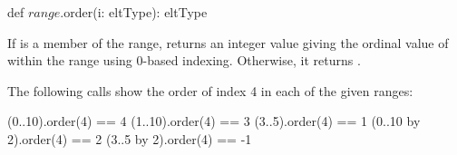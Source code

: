 \begin{protohead}
def $range$.order(i: eltType): eltType
\end{protohead}
\begin{protobody}
If  is a member of the range, returns an integer value giving
the ordinal value of  within the range using 0-based indexing.
Otherwise, it returns .
\end{protobody}

\begin{example}
The following calls show the order of index 4 in each of the given
ranges:
\begin{chapel}
(0..10).order(4) == 4
(1..10).order(4) == 3
(3..5).order(4) == 1
(0..10 by 2).order(4) == 2
(3..5 by 2).order(4) == -1
\end{chapel}
\end{example}

